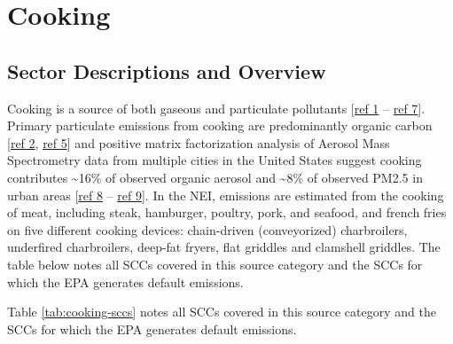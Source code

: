 \documentclass[
  11pt,
  oneside]{book}
\begin{document}
\chapter{Cooking}\label{cooking}

\section{Sector Descriptions and Overview}\label{sector-descriptions-and-overview}

Cooking is a source of both gaseous and particulate pollutants {[}\hyperref[cooking-references]{ref 1} -- \hyperref[cooking-references]{ref 7}{]}. Primary particulate emissions from cooking are predominantly organic carbon {[}\hyperref[cooking-references]{ref 2}, \hyperref[cooking-references]{ref 5}{]} and positive matrix factorization analysis of Aerosol Mass Spectrometry data from multiple cities in the United States suggest cooking contributes \textasciitilde16\% of observed organic aerosol and \textasciitilde8\% of observed PM2.5 in urban areas {[}\hyperref[cooking-references]{ref 8} -- \hyperref[cooking-references]{ref 9}{]}. In the NEI, emissions are estimated from the cooking of meat, including steak, hamburger, poultry, pork, and seafood, and french fries on five different cooking devices: chain-driven (conveyorized) charbroilers, underfired charbroilers, deep-fat fryers, flat griddles and clamshell griddles. The table below notes all SCCs covered in this source category and the SCCs for which the EPA generates default emissions.

Table \ref{tab:cooking-sccs} notes all SCCs covered in this source category and the SCCs for which the EPA generates default emissions.
\end{document}
